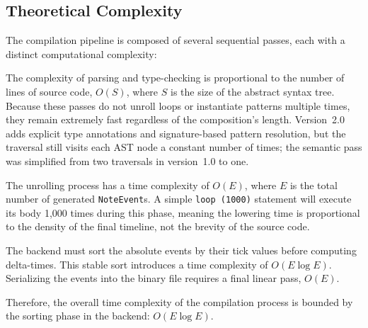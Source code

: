 \subsection{Theoretical Complexity}\label{detail-subsec:theoretical-complexity}

The compilation pipeline is composed of several sequential passes, each with a distinct computational complexity:

 The complexity of parsing and type-checking is proportional to the
number of lines of source code, $O(S)$, where $S$ is the size of the abstract syntax tree.
Because these passes do not unroll loops or instantiate patterns multiple times, they remain extremely fast regardless
of the composition's length.
Version~2.0 adds explicit type annotations and signature-based pattern resolution, but the traversal still visits each
AST node a constant number of times; the semantic pass was simplified from two traversals in version~1.0 to one.

 The unrolling process has a time complexity of $O(E)$, where $E$ is the total number
of generated \texttt{NoteEvent}s.
A simple \texttt{loop (1000)} statement will execute its body 1,000 times during this phase, meaning the lowering time
is proportional to the density of the final timeline, not the brevity of the source code.

 The backend must sort the absolute events by their tick values before computing
delta-times.
This stable sort introduces a time complexity of $O(E \log E)$.
Serializing the events into the binary file requires a final linear pass, $O(E)$.

Therefore, the overall time complexity of the compilation process is bounded by the sorting phase in the backend:
$O(E \log E)$.
